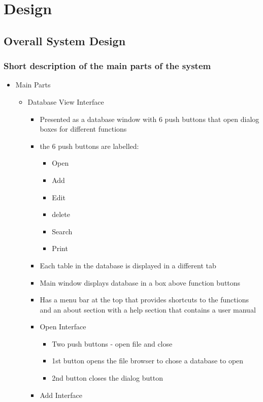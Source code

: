 \chapter{Design}

\section{Overall System Design}

\subsection{Short description of the main parts of the system}

\begin {itemize}
	\item Main Parts
	\begin {itemize}
		\item Database View Interface
		\begin {itemize}
			\item Presented as a database window with 6 push buttons that open dialog boxes for different functions
			\item the 6 push buttons are labelled:
			\begin {itemize}
				\item Open
				\item Add
				\item Edit
				\item delete
				\item Search
				\item Print
			\end {itemize}
		\item Each table in the database is displayed in a different tab
		\item Main window displays database in a box above function buttons
		\item Has a menu bar at the top that provides shortcuts to the functions and an about section with a help section that contains   a user manual
	\item Open Interface
	\begin {itemize}
		\item Two push buttons - open file and close
		\item 1st button opens the file browser to chose a database to open
		\item 2nd button closes the dialog button
	\end {itemize}
	\item Add Interface

\end{itemize}
\end{itemize}
\end{itemize}

